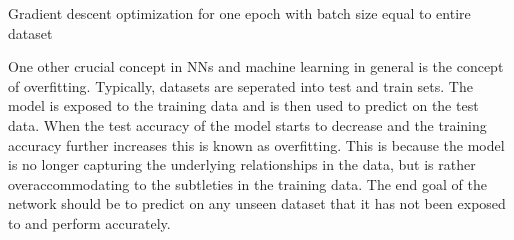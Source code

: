 \begin{algorithm}[!t] \AlgoFontSize \DontPrintSemicolon {} 
  \BlankLine


  \BlankLine


  \BlankLine

  \BlankLine


  \caption{Gradient descent optimization for one epoch with batch size equal to entire dataset}
  \label{review:algo:grad}
\end{algorithm}

One other crucial concept in \ac{NN}s and machine learning in general is the concept
of overfitting. Typically, datasets are seperated into test and train sets. The
model is exposed to the training data and is then used to predict on the test
data. When the test accuracy of the model starts to decrease and the training
accuracy further increases this is known as overfitting. This is because the
model is no longer capturing the underlying relationships in the data, but is
rather overaccommodating to the subtleties in the training data. The end goal of
the network should be to predict on any unseen dataset that it has not been
exposed to and perform accurately.

